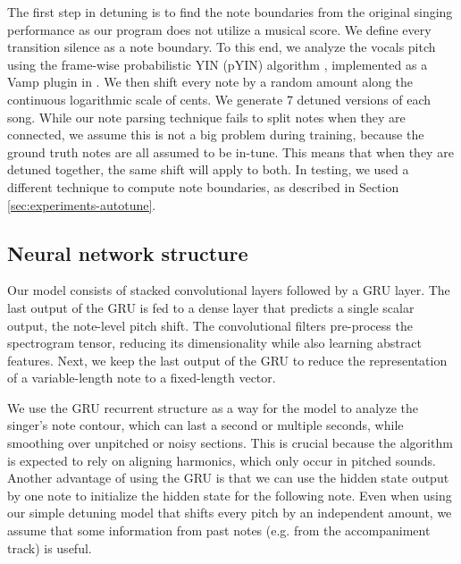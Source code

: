 The first step in detuning is to find the note boundaries from the original singing performance as our program does not utilize a musical score. We define every transition silence as a note boundary. To this end, we analyze the vocals pitch using the frame-wise probabilistic YIN (pYIN) algorithm \cite{mauch2014pyin}, implemented as a Vamp plugin in \cite{cannam2010sonic}. We then shift every note by a random amount along the continuous logarithmic scale of cents. We generate 7 detuned versions of each song. While our note parsing technique fails to split notes when they are connected, we assume this is not a big problem during training, because the ground truth notes are all assumed to be in-tune. This means that when they are detuned together, the same shift will apply to both. In testing, we used a different technique to compute note boundaries, as described in Section \ref{sec:experiments-autotune}.
\subsection{Neural network structure}
Our model consists of stacked convolutional layers followed by a GRU layer. The last output of the GRU is fed to a dense layer that predicts a single scalar output, the note-level pitch shift. The convolutional filters pre-process the spectrogram tensor, reducing its dimensionality while also learning abstract features. Next, we keep the last output of the GRU to reduce the representation of a variable-length note to a fixed-length vector.

We use the GRU recurrent structure as a way for the model to analyze the singer's note contour, which can last a second or multiple seconds, while smoothing over unpitched or noisy sections. This is crucial because the algorithm is expected to rely on aligning harmonics, which only occur in pitched sounds. Another advantage of using the GRU is that we can use the hidden state output by one note to initialize the hidden state for the following note. Even when using our simple detuning model that shifts every pitch by an independent amount, we assume that some information from past notes (e.g. from the accompaniment track) is useful.

